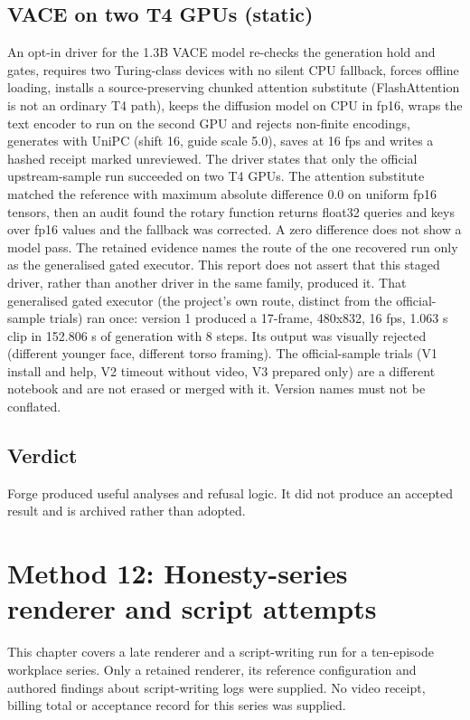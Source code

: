 \documentclass[11pt,a4paper]{article}
\begin{document}
\subsection{VACE on two T4 GPUs (static)}
An opt-in driver for the 1.3B VACE model re-checks the generation hold and gates, requires two Turing-class devices with no silent CPU fallback, forces offline loading, installs a source-preserving chunked attention substitute (FlashAttention is not an ordinary T4 path), keeps the diffusion model on CPU in fp16, wraps the text encoder to run on the second GPU and rejects non-finite encodings, generates with UniPC (shift 16, guide scale 5.0), saves at 16 fps and writes a hashed receipt marked unreviewed. The driver states that only the official upstream-sample run succeeded on two T4 GPUs. The attention substitute matched the reference with maximum absolute difference 0.0 on uniform fp16 tensors, then an audit found the rotary function returns float32 queries and keys over fp16 values and the fallback was corrected. A zero difference does not show a model pass. The retained evidence names the route of the one recovered run only as the generalised gated executor. This report does not assert that this staged driver, rather than another driver in the same family, produced it. That generalised gated executor (the project's own route, distinct from the official-sample trials) ran once: version 1 produced a 17-frame, 480x832, 16 fps, 1.063 s clip in 152.806 s of generation with 8 steps. Its output was visually rejected (different younger face, different torso framing). The official-sample trials (V1 install and help, V2 timeout without video, V3 prepared only) are a different notebook and are not erased or merged with it. Version names must not be conflated.

\subsection{Verdict}
Forge produced useful analyses and refusal logic. It did not produce an accepted result and is archived rather than adopted.
\section{Method 12: Honesty-series renderer and script attempts}
\label{sec:honesty}
This chapter covers a late renderer and a script-writing run for a ten-episode workplace series. Only a retained renderer, its reference configuration and authored findings about script-writing logs were supplied. No video receipt, billing total or acceptance record for this series was supplied.
\end{document}
